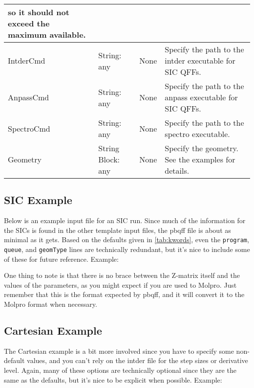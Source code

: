 \documentclass{article}
\begin{document}
\begin{table}[ht]
\begin{tabular}{|l|>{\raggedright}p{}|l|p{}|}
                                                   so it should not exceed the maximum available.\\
    \hline
    IntderCmd                     & String: any & None & Specify the path to the intder executable for SIC QFFs.\\
    \hline
    AnpassCmd                     & String: any & None & Specify the path to the anpass executable for SIC QFFs.\\
    \hline
    SpectroCmd                    & String: any & None & Specify the path to the spectro executable.\\
    \hline
    Geometry                      & String Block: any & None & Specify the geometry. See the examples for details.\\
    \hline
  \end{tabular}
\end{table}

\subsection{SIC Example}

Below is an example input file for an SIC run. Since much of the
information for the SICs is found in the other template input files,
the pbqff file is about as minimal as it gets. Based on the defaults
given in \autoref{tab:kwords}, even the \verb|program|,
\verb|queue|, and \verb|geomType| lines are technically redundant, but
it's nice to include some of these for future reference. Example:



One thing to note is that there is no brace between the Z-matrix
itself and the values of the parameters, as you might expect if you
are used to Molpro. Just remember that this is the format expected by
pbqff, and it will convert it to the Molpro format when necessary.

\subsection{Cartesian Example}

The Cartesian example is a bit more involved since you have to specify
some non-default values, and you can't rely on the intder file for the
step sizes or derivative level. Again, many of these options are
technically optional since they are the same as the defaults, but it's
nice to be explicit when possible. Example:
\end{document}
